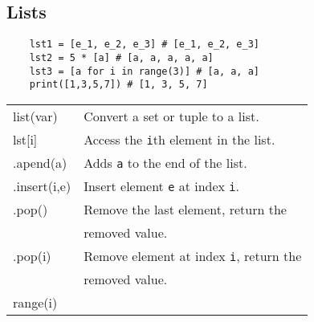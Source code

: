\documentclass[5pt]{article}
\begin{document}
\begin{multicols}{2}
\subsection{Lists}
\begin{verbatim}
    lst1 = [e_1, e_2, e_3] # [e_1, e_2, e_3]
    lst2 = 5 * [a] # [a, a, a, a, a]
    lst3 = [a for i in range(3)] # [a, a, a]
    print([1,3,5,7]) # [1, 3, 5, 7]
\end{verbatim}
\begin{tabular}{>{\ttfamily}l l}
    list(var)       & Convert a set or tuple to a list.\\
    lst[i]          & Access the \texttt{i}th element in the list.\\
    .apend(a)       & Adds \texttt{a} to the end of the list.\\
    .insert(i,e)    & Insert element \texttt{e} at index \texttt{i}.\\
    .pop()          & Remove the last element, return the \\
                    & removed value.\\
    .pop(i)         & Remove element at index \texttt{i}, return the \\
                    & removed value.\\
    range(i)        & \\
\end{tabular}



\end{multicols}
\end{document}
